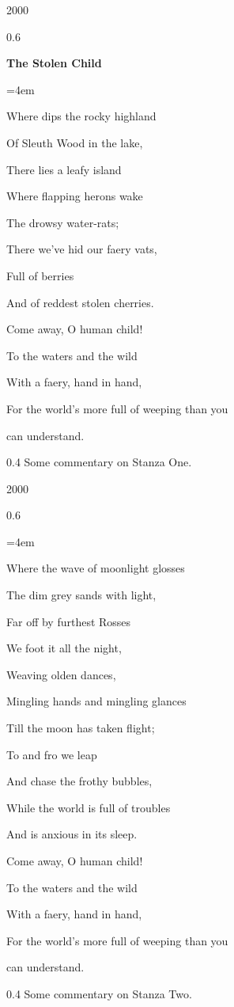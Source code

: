 \documentclass{sn-jnl}
\theoremstyle{thmstyleone}%
\theoremstyle{thmstyletwo}%
\theoremstyle{thmstylethree}%
\numberwithin{equation}{section}
\newenvironment{poem}{\setlength{\parindent}{0em}}{}
\newcommand{\poemTitle}[1]{\begin{center}\large\textbf{#1}\end{center}}
\newenvironment{stanza}{\vspace{0.25 em}\hangindent=4em}{\vspace{1 em}}
\newcommand{\poemlineleft}[1]{{\raggedright{#1}\par}\vspace{-\parskip}}
\begin{document}
\begin{sidebyside}{2}{0}{0}{0}%
\begin{sbspanel}{0.6}%
\begin{poem}%
\poemTitle{The Stolen Child}
%
\begin{stanza}
\poemlineleft{Where dips the rocky highland}
\poemlineleft{Of Sleuth Wood in the lake,}
\poemlineleft{There lies a leafy island}
\poemlineleft{Where flapping herons wake}
\poemlineleft{The drowsy water-rats;}
\poemlineleft{There we've hid our faery vats,}
\poemlineleft{Full of berries}
\poemlineleft{And of reddest stolen cherries.}
\poemlineleft{Come away, O human child!}
\poemlineleft{To the waters and the wild}
\poemlineleft{With a faery, hand in hand,}
\poemlineleft{For the world's more full of weeping than you}
\poemlineleft{can understand.}
\end{stanza}
\end{poem}
\end{sbspanel}%
\begin{sbspanel}{0.4}%
Some commentary on Stanza One.%
\end{sbspanel}%
\end{sidebyside}%
\begin{sidebyside}{2}{0}{0}{0}%
\begin{sbspanel}{0.6}%
\begin{poem}%
\poemTitle{}
\begin{stanza}
\poemlineleft{Where the wave of moonlight glosses}
\poemlineleft{The dim grey sands with light,}
\poemlineleft{Far off by furthest Rosses}
\poemlineleft{We foot it all the night,}
\poemlineleft{Weaving olden dances,}
\poemlineleft{Mingling hands and mingling glances}
\poemlineleft{Till the moon has taken flight;}
\poemlineleft{To and fro we leap}
\poemlineleft{And chase the frothy bubbles,}
\poemlineleft{While the world is full of troubles}
\poemlineleft{And is anxious in its sleep.}
\poemlineleft{Come away, O human child!}
\poemlineleft{To the waters and the wild}
\poemlineleft{With a faery, hand in hand,}
\poemlineleft{For the world's more full of weeping than you}
\poemlineleft{can understand.}
\end{stanza}
\end{poem}
\end{sbspanel}%
\begin{sbspanel}{0.4}%
Some commentary on Stanza Two.%
\end{sbspanel}%
\end{sidebyside}%
\end{document}
